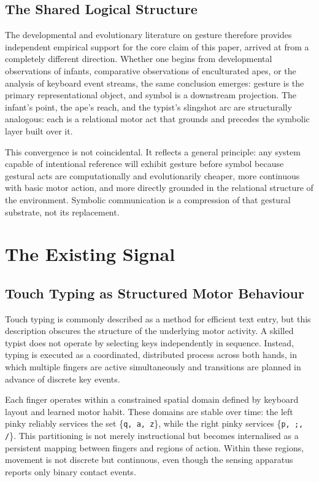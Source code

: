 \documentclass[11pt, a4paper]{article}
\begin{document}
\subsection{The Shared Logical Structure}

The developmental and evolutionary literature on gesture therefore
provides independent empirical support for the core claim of this paper,
arrived at from a completely different direction. Whether one begins
from developmental observations of infants, comparative observations of
enculturated apes, or the analysis of keyboard event streams, the same
conclusion emerges: gesture is the primary representational object, and
symbol is a downstream projection. The infant's point, the ape's reach,
and the typist's slingshot arc are structurally analogous: each is a
relational motor act that grounds and precedes the symbolic layer built
over it.

This convergence is not coincidental. It reflects a general principle:
any system capable of intentional reference will exhibit gesture before
symbol because gestural acts are computationally and evolutionarily
cheaper, more continuous with basic motor action, and more directly
grounded in the relational structure of the environment. Symbolic
communication is a compression of that gestural substrate, not its
replacement.

\section{The Existing Signal}

\subsection{Touch Typing as Structured Motor Behaviour}

Touch typing is commonly described as a method for efficient text entry,
but this description obscures the structure of the underlying motor
activity. A skilled typist does not operate by selecting keys
independently in sequence. Instead, typing is executed as a coordinated,
distributed process across both hands, in which multiple fingers are
active simultaneously and transitions are planned in advance of discrete
key events.

Each finger operates within a constrained spatial domain defined by
keyboard layout and learned motor habit. These domains are stable over
time: the left pinky reliably services the set \{\texttt{q, a, z}\},
while the right pinky services \{\texttt{p, ;, /}\}. This partitioning
is not merely instructional but becomes internalised as a persistent
mapping between fingers and regions of action. Within these regions,
movement is not discrete but continuous, even though the sensing
apparatus reports only binary contact events.
\end{document}

